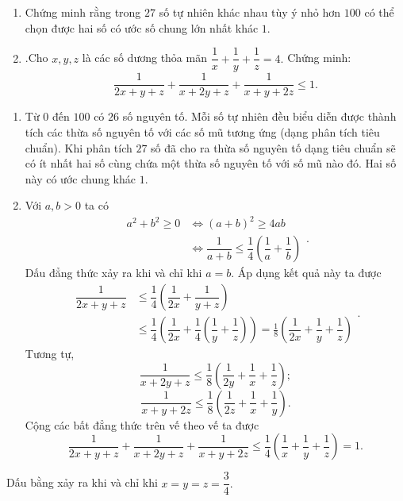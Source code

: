 \begin{ex}%
    \hfill
    \begin{enumerate}
        \item  Chứng minh rằng trong $ 27$ số tự nhiên khác nhau tùy ý nhỏ hơn $100$ có thể chọn được hai số có ước số chung lớn nhất  khác $1$.
        \item .Cho $x, y, z$ là các số dương thỏa mãn $\dfrac{1}{x}+\dfrac{1}{y}+\dfrac{1}{z}=4.$ Chứng minh:
	$$\dfrac{1}{2x+y+z}+\dfrac{1}{x+2y+z}+\dfrac{1}{x+y+2z}\leq 1.$$
    \end{enumerate}
\loigiai
    {
    \begin{enumerate}
        \item Từ $0$ đến $100$ có $26$ số nguyên tố. Mỗi số tự nhiên đều biểu diễn được thành tích các thừa số nguyên tố với các số mũ tương ứng (dạng phân tích tiêu chuẩn).
Khi phân tích $27$ số đã cho ra thừa số nguyên tố dạng tiêu chuẩn sẽ có ít nhất hai số cùng chứa một thừa số nguyên tố với số mũ nào đó. Hai số này có ước chung khác $1$.

        \item Với $a,b>0$ ta có
$$ \begin{aligned}
a^2+b^2\geq 0&\Leftrightarrow (a+b)^2\geq 4ab\\
& \Leftrightarrow \dfrac{1}{a+b}\leq \dfrac{1}{4}\left(\dfrac{1}{a}+\dfrac{1}{b}\right)
\end{aligned}. $$
Dấu đẳng thức xảy ra khi và chỉ khi $a=b.$ Áp dụng kết quả này ta được
$$ \begin{aligned}
\dfrac{1}{2x+y+z}&\leq \dfrac{1}{4}\left(\dfrac{1}{2x}+\dfrac{1}{y+z}\right)\\
&\leq \dfrac{1}{4}\left(\dfrac{1}{2x}+\dfrac{1}{4}\left(\dfrac{1}{y}+\dfrac{1}{z}\right)\right) =\frac{1}{8}\left(\dfrac{1}{2x}+\dfrac{1}{y}+\dfrac{1}{z}\right)
\end{aligned} .$$
Tương tự, $$ \dfrac{1}{x+2y+z}\leq  \frac{1}{8}\left(\dfrac{1}{2y}+\dfrac{1}{x}+\dfrac{1}{z}\right);$$
$$ \dfrac{1}{x+y+2z}\leq  \frac{1}{8}\left(\dfrac{1}{2z}+\dfrac{1}{x}+\dfrac{1}{y}\right).$$
Cộng các bất đẳng thức trên vế theo vế ta được
$$\dfrac{1}{2x+y+z}+\dfrac{1}{x+2y+z}+\dfrac{1}{x+y+2z}\leq  \frac{1}{4}\left(\dfrac{1}{x}+\dfrac{1}{y}+\dfrac{1}{z}\right)= 1.$$
    \end{enumerate}
Dấu bằng xảy ra khi và chỉ khi $x=y=z=\dfrac{3}{4}.$
    }
\end{ex}
